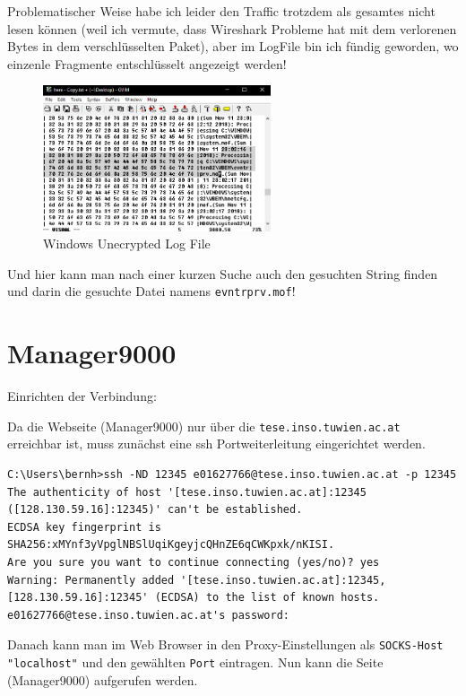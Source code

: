 \documentclass[12pt,a4paper,titlepage,oneside]{scrartcl}
\begin{document}
Problematischer Weise habe ich leider den Traffic trotzdem als gesamtes nicht lesen können (weil ich vermute, dass Wireshark Probleme hat mit dem verlorenen Bytes in dem verschlüsselten Paket), aber im LogFile bin ich fündig geworden, wo einzenle Fragmente entschlüsselt angezeigt werden!

\begin{figure}[h!]
  \centering
    \includegraphics[width=0.6\textwidth]{./imgs/intranet_screenshots/windowsLogFile.png}
  \caption{Windows Unecrypted Log File}
  \label{fig:winLog}
\end{figure}

Und hier kann man nach einer kurzen Suche auch den gesuchten String finden und darin die gesuchte Datei namens \lstinline{evntrprv.mof}!

\section{Manager9000}

Einrichten der Verbindung:

Da die Webseite (Manager9000) nur über die \lstinline{tese.inso.tuwien.ac.at} erreichbar ist, muss zunächst eine ssh Portweiterleitung eingerichtet werden.

\begin{lstlisting}
C:\Users\bernh>ssh -ND 12345 e01627766@tese.inso.tuwien.ac.at -p 12345
The authenticity of host '[tese.inso.tuwien.ac.at]:12345 ([128.130.59.16]:12345)' can't be established.
ECDSA key fingerprint is SHA256:xMYnf3yVpglNBSlUqiKgeyjcQHnZE6qCWKpxk/nKISI.
Are you sure you want to continue connecting (yes/no)? yes
Warning: Permanently added '[tese.inso.tuwien.ac.at]:12345,[128.130.59.16]:12345' (ECDSA) to the list of known hosts.
e01627766@tese.inso.tuwien.ac.at's password:
\end{lstlisting}

Danach kann man im Web Browser in den Proxy-Einstellungen als \lstinline{SOCKS-Host "localhost"} und den gewählten \lstinline{Port} eintragen. Nun kann die Seite (Manager9000) aufgerufen werden.
\end{document}
